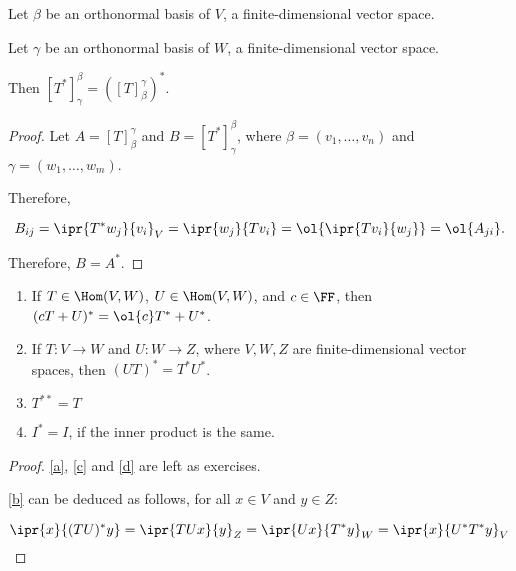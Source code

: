 \documentclass[11pt]{scrartcl}
\begin{document}
\begin{theorem}
  \label{6-10}

  Let $\beta$ be an orthonormal basis of $V$, a finite-dimensional
  vector space.

  Let $\gamma$ be an orthonormal basis of $W$, a finite-dimensional
  vector space.

  Then $[T^{*}]_{\gamma}^{\beta} = ([T]^{\gamma}_{\beta})^{*}$.
\end{theorem}

\begin{proof}
  Let $A = [T]_{\beta}^{\gamma}$ and $B= [T^{*}]_{\gamma}^{\beta}$,
  where $\beta = (v_1, \dots, v_n)$ and $\gamma=(w_1, \dots, w_m)$.

  Therefore,

  \[B_{ij} = \ipr{T^{*}w_j}{v_i}_V = \ipr{w_j}{Tv_i} = \ol{\ipr{Tv_i}{w_j}} = \ol{A_{ji}}.\]

  Therefore, $B = A^{*}$.
\end{proof}

\begin{theorem}
  \label{6-11}
  \begin{enumerate}[label=\alph*)]
    \label{a}
  \item If $T \in \Hom(V,W)$, $U \in \Hom(V,W)$, and $c\in\FF$, then
    $(cT+U)^{*} = \ol{c}T^{*}+U^{*}$.
    \label{b}
  \item If $T:V\to W$ and $U:W\to Z$, where $V, W, Z$ are
    finite-dimensional vector spaces, then $(UT)^{*}=T^{*}U^{*}$.
    \label{c}
  \item $T^{**}=T$
    \label{d}
  \item $I^{*}=I$, if the inner product is the same.
  \end{enumerate}
\end{theorem}

\begin{proof}
  \ref{a}, \ref{c} and \ref{d} are left as exercises.
  
  \ref{b} can be deduced as follows, for all $x\in V$ and $y\in Z$:

  \[
    \ipr{x}{(TU)^{*}y} = \ipr{TUx}{y}_Z = \ipr{Ux}{T^{*}y}_W = \ipr{x}{U^{*}T^{*}y}_V
  \]
\end{proof}
\end{document}
